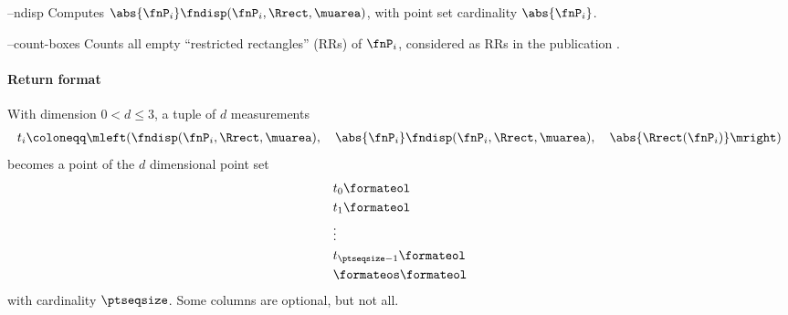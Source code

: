 \begin{procarg}{--ndisp}
  Computes $\abs{\fnP_i} \fndisp(\fnP_i, \Rrect, \muarea)$, with point set cardinality $\abs{\fnP_i}$.
\end{procarg}

\begin{procarg}{--count-boxes}
  Counts all empty \enquote{restricted rectangles} (RRs) of $\fnP_i$, considered as RRs in the publication .
\end{procarg}

\procarginseq{\ptseqsize}

\procargout

\procargsilent

\paragraph{Return format}

With dimension $0 < d \leq 3$, a tuple of $d$ measurements
\begin{align*}
  t_i \coloneqq \mleft( \fndisp(\fnP_i, \Rrect, \muarea),\quad \abs{\fnP_i} \fndisp(\fnP_i, \Rrect, \muarea),\quad \abs{\Rrect(\fnP_i)} \mright)
\end{align*}
becomes a point of the $d$ dimensional point set
\begin{align*}
  &t_0\formateol\\
  &t_1\formateol\\
  &\vdots \\
  &t_{\ptseqsize-1}\formateol\\
  &\formateos\formateol
\end{align*}
with cardinality $\ptseqsize$. Some columns are optional, but not all. 


